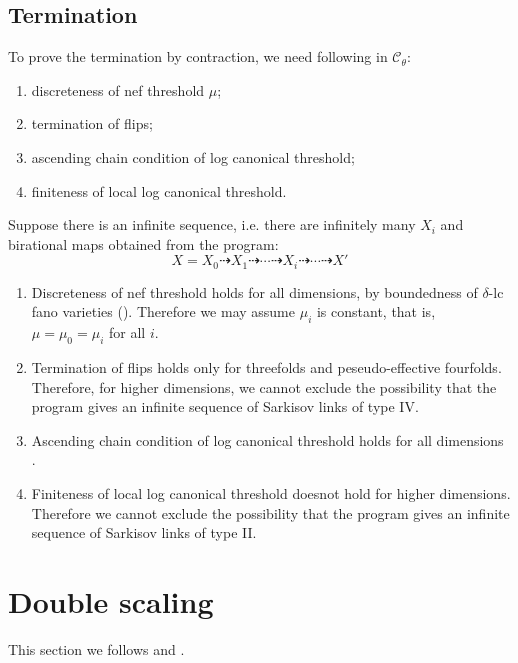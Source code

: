 \documentclass[11pt]{amsart}
\numberwithin{equation}{section}
\begin{document}
\subsection{Termination}
To prove the termination by contraction, we need following in $\mathcal{C}_{\theta}$: 
\begin{enumerate}
  \item discreteness of nef threshold $\mu$;
  \item termination of flips;
  \item ascending chain condition of log canonical threshold;
  \item finiteness of local log canonical threshold.
\end{enumerate}
Suppose there is an infinite sequence, i.e. there are infinitely many $ X_i $ and birational maps obtained from the program:
\[ X=X_0\dashrightarrow X_1\dashrightarrow \cdots\dashrightarrow X_i \dashrightarrow\cdots\dashrightarrow X'\]
\begin{enumerate}
  \item Discreteness of nef threshold holds for all dimensions, by boundedness of $\delta$-lc fano varieties (\cite[Theorem 1.1]{birkarSingularitiesLinearSystems2020}). Therefore we may assume $\mu_{i}$ is constant, that is, $\mu=\mu_{0}=\mu_{i}$ for all $i$.
  \item  Termination of flips holds only for threefolds and peseudo-effective fourfolds.  
    Therefore, for higher dimensions, we cannot exclude the possibility that the program gives an infinite sequence of Sarkisov links of type IV.
  \item Ascending chain condition of log canonical threshold holds for all dimensions \cite{HMX14}.
  \item Finiteness of local log canonical threshold doesnot hold for higher dimensions. Therefore we cannot exclude the possibility that  the program gives an infinite sequence of Sarkisov links of type II.

\end{enumerate}

\section{Double scaling}
This section we follows \cite[13.The Sarkisov program]{haconMinimalModelProgram2012} and  \cite{liuSarkisovProgramGeneralized2021}.
\end{document}
